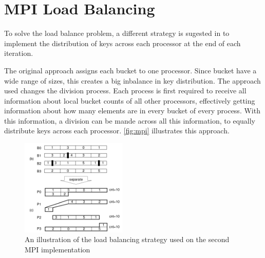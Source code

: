 \section{MPI Load Balancing}
\label{sec:mpi_bal}

To solve the load balance problem, a different strategy is sugested in \cite{paper} to implement the distribution of keys across each processor at the end of each iteration.

The original approach assigns each bucket to one processor. Since bucket have a wide range of sizes, this creates a big inbalance in key distribution. The approach used changes the division process. Each process is first required to receive all information about local bucket counts of all other processors, effectively getting information about how many elements are in every bucket of every process. With this information, a division can be mande across all this information, to equally distribute keys across each processor. \autoref{fig:mpi} illustrates this approach.

\begin{figure}[!htpb]
	\begin{center}
		\includegraphics[width=0.45\textwidth]{images/mpi_bal}
	\end{center}
	\caption{An illustration of the load balancing strategy used on the second MPI implementation}
	\label{fig:mpi}
\end{figure}

